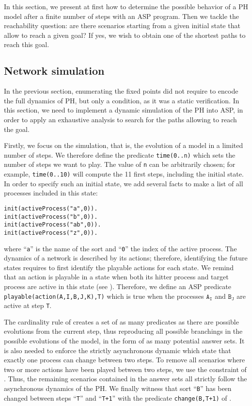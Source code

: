 
In this section, we present at first how to determine the possible behavior of a PH model after a finite number of steps with an ASP program.
Then we tackle the reachability question: are there scenarios starting from a given initial state
that allow to reach a given goal? If yes, we wish to obtain one of the shortest paths to reach this goal.

\subsection{Network simulation}
In the previous section, enumerating the fixed points did not require to
encode the full dynamics of PH, but only a condition, as it was a static verification.
In this section, we need to implement a dynamic simulation of the PH into ASP, in order to apply an exhaustive analysis to search for the paths allowing to reach the goal.

Firstly, we focus on the simulation, that is, the evolution of a model in a limited number of steps.
We therefore define the predicate \texttt{time(0..n)} which sets the number of steps we want to play.
The value of \texttt{n} can be arbitrarily chosen;
for example, \texttt{time(0..10)} will compute the 11 first steps,
including the initial state.
In order to specify such an initial state, we add several facts
to make a list of all processes included in this state:
\begin{lstlisting}
init(activeProcess("a",0)).
init(activeProcess("b",0)).
init(activeProcess("ab",0)).
init(activeProcess("z",0)).
\end{lstlisting}
where ``\texttt{a}'' is the name of the sort and ``\texttt{0}'' the index of the active process.
The dynamics of a network is described by its actions;
therefore, identifying the future states requires to first identify the playable actions for each state.
We remind that an action is playable in a state when both its hitter process and target process are active in this state (see ).
Therefore, we define an ASP predicate \texttt{playable(action(A,I,B,J,K),T)} which is true
when the processes $\texttt{A}_\texttt{I}$ and $\texttt{B}_\texttt{J}$ are active at step \texttt{T}.

The cardinality rule of 
creates a set of as many predicates as there are possible evolutions from the current step,
thus reproducing all possible branchings in the possible evolutions of the model, in the form of as many potential answer sets. It is also needed to enforce the strictly asynchronous dynamic
which state that exactly one process can change between two steps.
To remove all scenarios where two or more actions have been played between
two steps, we use the constraint of .
Thus, the remaining scenarios contained in the answer sets all strictly follow
the asynchronous dynamics of the PH.
We finally witness that sort ``\texttt{B}'' has been changed between steps ``\texttt{T}'' and ``\texttt{T+1}'' with the predicate \texttt{change(B,T+1)} of .

